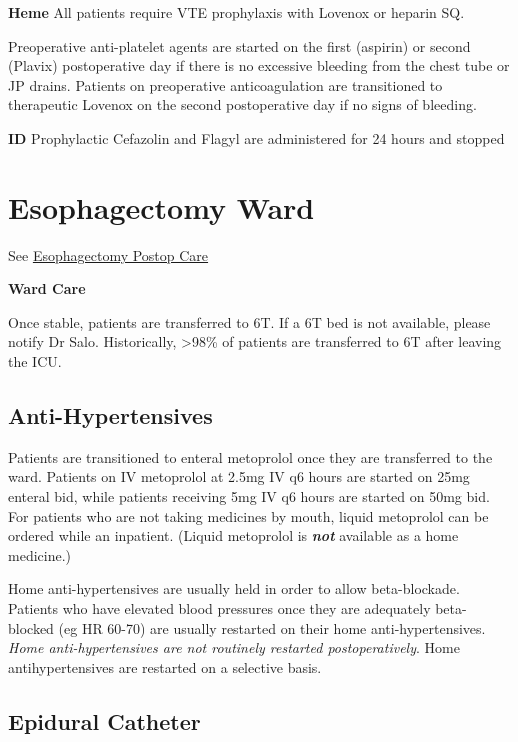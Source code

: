 \documentclass[
  letterpaper,
]{scrbook}
\begin{document}
\textbf{Heme} All patients require VTE prophylaxis with Lovenox or
heparin SQ.

Preoperative anti-platelet agents are started on the first (aspirin) or
second (Plavix) postoperative day if there is no excessive bleeding from
the chest tube or JP drains. Patients on preoperative anticoagulation
are transitioned to therapeutic Lovenox on the second postoperative day
if no signs of bleeding.

\textbf{ID} Prophylactic Cefazolin and Flagyl are administered for 24
hours and stopped

\chapter{Esophagectomy Ward}\label{esophagectomy-ward}

See
\href{https://gisurgonc.github.io/talks/eso_postop_care.htm}{Esophagectomy
Postop Care}

\textbf{Ward Care}

Once stable, patients are transferred to 6T. If a 6T bed is not
available, please notify Dr Salo. Historically, \textgreater98\% of
patients are transferred to 6T after leaving the ICU.

\section{Anti-Hypertensives}\label{anti-hypertensives}

Patients are transitioned to enteral metoprolol once they are
transferred to the ward. Patients on IV metoprolol at 2.5mg IV q6 hours
are started on 25mg enteral bid, while patients receiving 5mg IV q6
hours are started on 50mg bid. For patients who are not taking medicines
by mouth, liquid metoprolol can be ordered while an inpatient. (Liquid
metoprolol is \textbf{\emph{not}} available as a home medicine.)

Home anti-hypertensives are usually held in order to allow
beta-blockade. Patients who have elevated blood pressures once they are
adequately beta-blocked (eg HR 60-70) are usually restarted on their
home anti-hypertensives. \emph{Home anti-hypertensives are not routinely
restarted postoperatively}. Home antihypertensives are restarted on a
selective basis.

\section{Epidural Catheter}\label{epidural-catheter}
\end{document}
